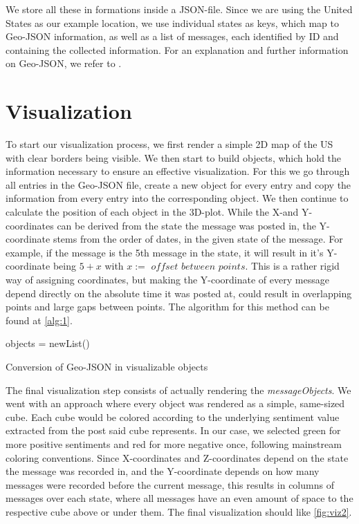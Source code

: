 We store all these in formations inside a JSON-file. Since we are using the United States as our example location, we use individual states as keys, which map to Geo-JSON information, as well as a list of messages, each identified by ID and containing the collected information. For an explanation and further information on Geo-JSON, we refer to \cite{rfc7946}.

\section{Visualization} 
To start our visualization process, we first render a simple 2D map of the US with clear borders being visible. We then start to build objects, which hold the information necessary to ensure an effective visualization. For this we go through all entries in the Geo-JSON file, create a new object for every entry and copy the information from every entry into the corresponding object. We then continue to calculate the position of each object in the 3D-plot. While the X-and Y-coordinates can be derived from the state the message was posted in, the Y-coordinate stems from the order of dates, in the given state of the message. For example, if the message is the 5th message in the state, it will result in it's Y-coordinate being $5+x$ with $x:=$ $offset$ $between$ $points$. This is a rather rigid way of assigning coordinates, but making the Y-coordinate of every message depend directly on the absolute time it was posted at, could result in overlapping points and large gaps between points. The algorithm for this method can be found at \ref{alg:1}.

\begin{algorithm}[H]
 objects = newList() \; 
 \label{alg:1}
 \caption{Conversion of Geo-JSON in visualizable objects}
\end{algorithm}

The final visualization step consists of actually rendering the \emph{messageObjects}. We went with an approach where every object was rendered as a simple, same-sized cube. Each cube would be colored according to the underlying sentiment value extracted from the post said cube represents. In our case, we selected green for more positive sentiments and red for more negative once, following mainstream coloring conventions. Since X-coordinates and Z-coordinates depend on the state the message was recorded in, and the Y-coordinate depends on how many messages were recorded before the current message, this results in columns of messages over each state, where all messages have an even amount of space to the respective cube above or under them. The final visualization should like \ref{fig:viz2}. 

